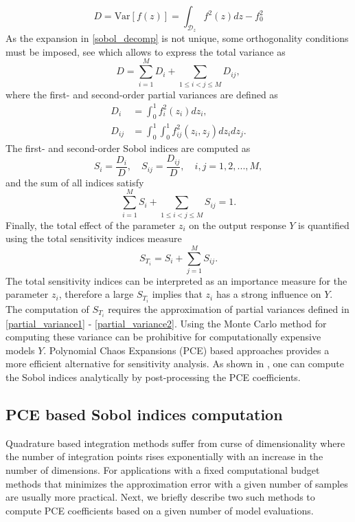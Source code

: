 \documentclass[review]{elsarticle}
\numberwithin{equation}{section}
\numberwithin{equation}{section}
\begin{document}
\begin{equation}\label{tot_var}
D = \text{Var}[f(z)] = \int_{\mathcal{D}_{z}} f^2(z)dz - f_0^2
\end{equation}
As the expansion in \eqref{sobol_decomp} is not unique, some orthogonality conditions must be imposed, see \cite{Rabitz1999,SOBOL2001271} which allows to express the total variance as
\begin{equation}
D = \sum_{i=1}^M D_i + \sum_{1\leq i<j\leq M} D_{ij},
\end{equation}
where the first- and second-order partial variances are defined as
\begin{align}
D_i &= \int_{0}^{1} f^2_i(z_i)dz_i, \label{partial_variance1}\\
D_{ij} &= \int_{0}^{1} \int_{0}^{1} f^2_{ij}(z_i,z_j)dz_idz_j \label{partial_variance2}. 
\end{align}
The first- and second-order Sobol indices are computed as
\begin{equation}\label{sobol_ind}
S_i = \frac{D_i}{D}, \quad  S_{ij} = \frac{D_{ij}}{D}, \quad i,j=1,2, ..., M,
\end{equation}
and the sum of all indices satisfy
\begin{equation}
\sum_{i=1}^M S_i + \sum_{1\leq i<j\leq M} S_{ij} = 1.
\end{equation}
Finally, the total effect of the parameter $z_i$ on the output response $Y$ is quantified using the total sensitivity indices measure
\begin{equation}
S_{T_i} = S_i + \sum_{j=1}^M S_{ij}.
\end{equation}
The total sensitivity indices can be interpreted as an importance measure for the parameter $z_i$, therefore a large $S_{T_i}$ implies that $z_i$ has a strong influence on $Y$. The computation of $S_{T_i}$ requires the approximation of partial variances defined in \eqref{partial_variance1} - \eqref{partial_variance2}. Using the Monte Carlo method for computing these variance can be prohibitive for computationally expensive models $Y$.  Polynomial Chaos Expansions (PCE) based approaches provides a more efficient alternative for sensitivity analysis. As shown in  \cite{SUDRET2008964}, one can compute the Sobol indices analytically by post-processing the PCE coefficients.
\subsection{PCE based Sobol indices computation}

Quadrature based integration methods suffer from curse of dimensionality where the number of integration points rises exponentially with an increase in the number of dimensions. For applications with a fixed computational budget methods that minimizes the approximation error with a given number of samples are usually more practical. Next, we briefly describe two such methods to compute PCE coefficients based on a given number of model evaluations.
\end{document}
